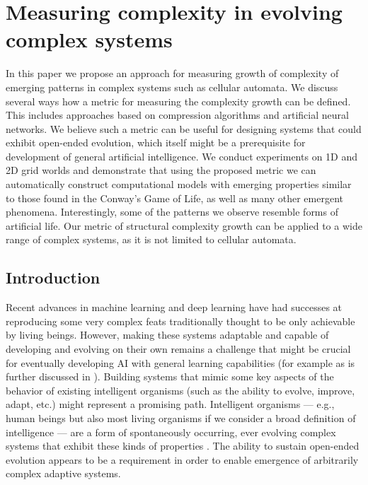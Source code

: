 \chapter{Measuring complexity in evolving complex systems}
\label{cha:meas-compl-evolv}

  In this paper we propose an approach for measuring growth of complexity of
  emerging patterns in complex systems such as cellular automata. We discuss
  several ways how a metric for measuring the complexity growth can be defined.
  This includes approaches based on compression algorithms and artificial neural
  networks. We believe such a metric can be useful for designing systems that
  could exhibit open-ended evolution, which itself might be a prerequisite for
  development of general artificial intelligence. We conduct experiments on 1D
  and 2D grid worlds and demonstrate that using the proposed metric we can
  automatically construct computational models with emerging properties similar
  to those found in the Conway's Game of Life, as well as many other emergent
  phenomena. Interestingly, some of the patterns we observe resemble forms of
  artificial life. Our metric of structural complexity growth can be applied to
  a wide range of complex systems, as it is not limited to cellular automata.

\section{Introduction}
Recent advances in machine learning and deep learning have had successes at
reproducing some very complex feats traditionally thought to be only achievable
by living beings. However, making these systems adaptable and capable of
developing and evolving on their own remains a challenge that might be crucial
for eventually developing AI with general learning capabilities (for example as
is further discussed in \parencite{mikolov2016roadmap}). Building systems that mimic
some key aspects of the behavior of existing intelligent organisms (such as the
ability to evolve, improve, adapt, etc.) might represent a promising path.
Intelligent organisms --- e.g., human beings but also most living organisms if
we consider a broad definition of intelligence --- are a form of spontaneously
occurring, ever evolving complex systems that exhibit these kinds of properties
\parencite{booker_perspectives_2004}. The ability to sustain open-ended evolution
appears to be a requirement in order to enable emergence of arbitrarily complex
adaptive systems.

